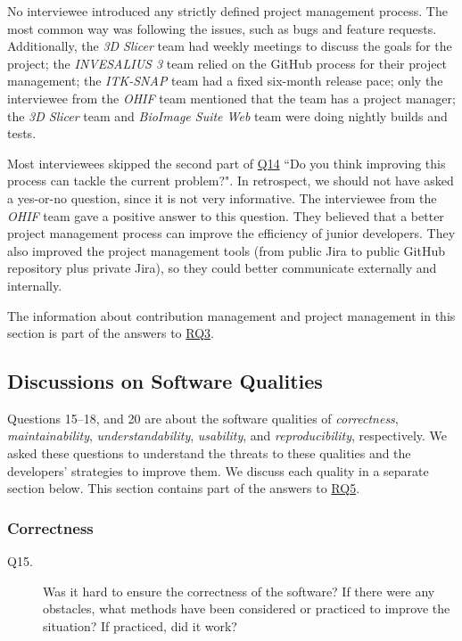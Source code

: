 \documentclass[3p, 12pt,authoryear]{elsarticle}
\begin{document}
No interviewee introduced any strictly defined project management process. The
most common way was following the issues, such as bugs and feature requests.
Additionally, the \textit{3D Slicer} team had weekly meetings to discuss the
goals for the project; the \textit{INVESALIUS 3} team relied on the GitHub
process for their project management; the \textit{ITK-SNAP} team had a fixed
six-month release pace; only the interviewee from the \textit{OHIF} team
mentioned that the team has a project manager; the \textit{3D Slicer} team and
\textit{BioImage Suite Web} team were doing nightly builds and tests.

Most interviewees skipped the second part of \hyperlink{q14}{Q14} ``Do you think
improving this process can tackle the current problem?". In retrospect, we
should not have asked a yes-or-no question, since it is not very informative.
The interviewee from the \textit{OHIF} team gave a positive answer to this
question. They believed that a better project management process can improve the
efficiency of junior developers. They also improved the project management tools
(from public Jira to public GitHub repository plus private Jira), so they could
better communicate externally and internally.

The information about contribution management and project management in this
section is part of the answers to \hyperlink{rq3}{RQ3}.

\subsection{Discussions on Software Qualities} \label{sec_interview_software_qualities}

Questions 15--18, and 20 are about the software qualities of
\textit{correctness}, \textit{maintainability}, \textit{understandability},
\textit{usability}, and \textit{reproducibility}, respectively. We asked these
questions to understand the threats to these qualities and the developers'
strategies to improve them. We discuss each quality in a separate section below.
This section contains part of the answers to \hyperlink{rq5}{RQ5}.

\subsubsection{Correctness} \label{sec_interview_correctness}

\begin{description}
\item[Q15.] Was it hard to ensure the correctness of the software? If there were
any obstacles, what methods have been considered or practiced to improve the
situation? If practiced, did it work?
\end{description}
\end{document}
